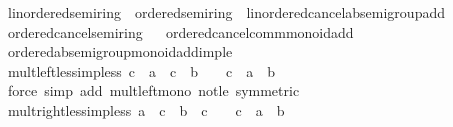 \begin{isabellebody}
\ linordered{\isacharunderscore}{\kern0pt}semiring\ {\isacharequal}{\kern0pt}\ ordered{\isacharunderscore}{\kern0pt}semiring\ {\isacharplus}{\kern0pt}\ linordered{\isacharunderscore}{\kern0pt}cancel{\isacharunderscore}{\kern0pt}ab{\isacharunderscore}{\kern0pt}semigroup{\isacharunderscore}{\kern0pt}add\isanewline
{}\isanewline
\isanewline
{}\isamarkupfalse%
\ ordered{\isacharunderscore}{\kern0pt}cancel{\isacharunderscore}{\kern0pt}semiring%
\isadelimproof
\ %
\endisadelimproof
%
\isatagproof
\isacommand{{\isachardot}{\kern0pt}{\isachardot}{\kern0pt}}\isamarkupfalse%
%
\endisatagproof
{\isafoldproof}%
%
\isadelimproof
%
\endisadelimproof
\isanewline
\isanewline
{}\isamarkupfalse%
\ ordered{\isacharunderscore}{\kern0pt}cancel{\isacharunderscore}{\kern0pt}comm{\isacharunderscore}{\kern0pt}monoid{\isacharunderscore}{\kern0pt}add%
\isadelimproof
\ %
\endisadelimproof
%
\isatagproof
\isacommand{{\isachardot}{\kern0pt}{\isachardot}{\kern0pt}}\isamarkupfalse%
%
\endisatagproof
{\isafoldproof}%
%
\isadelimproof
%
\endisadelimproof
\isanewline
\isanewline
{}\isamarkupfalse%
\ ordered{\isacharunderscore}{\kern0pt}ab{\isacharunderscore}{\kern0pt}semigroup{\isacharunderscore}{\kern0pt}monoid{\isacharunderscore}{\kern0pt}add{\isacharunderscore}{\kern0pt}imp{\isacharunderscore}{\kern0pt}le%
\isadelimproof
\ %
\endisadelimproof
%
\isatagproof
\isacommand{{\isachardot}{\kern0pt}{\isachardot}{\kern0pt}}\isamarkupfalse%
%
\endisatagproof
{\isafoldproof}%
%
\isadelimproof
%
\endisadelimproof
\isanewline
\isanewline
{}\isamarkupfalse%
\ mult{\isacharunderscore}{\kern0pt}left{\isacharunderscore}{\kern0pt}less{\isacharunderscore}{\kern0pt}imp{\isacharunderscore}{\kern0pt}less{\isacharcolon}{\kern0pt}\ {\isachardoublequoteopen}c\ {\isacharasterisk}{\kern0pt}\ a\ {\isacharless}{\kern0pt}\ c\ {\isacharasterisk}{\kern0pt}\ b\ {\isasymLongrightarrow}\ {}\ {\isasymle}\ c\ {\isasymLongrightarrow}\ a\ {\isacharless}{\kern0pt}\ b{\isachardoublequoteclose}\isanewline
%
\isadelimproof
\ \ %
\endisadelimproof
%
\isatagproof
{}\isamarkupfalse%
\ {\isacharparenleft}{\kern0pt}force\ simp\ add{\isacharcolon}{\kern0pt}\ mult{\isacharunderscore}{\kern0pt}left{\isacharunderscore}{\kern0pt}mono\ not{\isacharunderscore}{\kern0pt}le\ {\isacharbrackleft}{\kern0pt}symmetric{\isacharbrackright}{\kern0pt}{\isacharparenright}{\kern0pt}%
\endisatagproof
{\isafoldproof}%
%
\isadelimproof
\isanewline
%
\endisadelimproof
\isanewline
{}\isamarkupfalse%
\ mult{\isacharunderscore}{\kern0pt}right{\isacharunderscore}{\kern0pt}less{\isacharunderscore}{\kern0pt}imp{\isacharunderscore}{\kern0pt}less{\isacharcolon}{\kern0pt}\ {\isachardoublequoteopen}a\ {\isacharasterisk}{\kern0pt}\ c\ {\isacharless}{\kern0pt}\ b\ {\isacharasterisk}{\kern0pt}\ c\ {\isasymLongrightarrow}\ {}\ {\isasymle}\ c\ {\isasymLongrightarrow}\ a\ {\isacharless}{\kern0pt}\ b{\isachardoublequoteclose}\isanewline

\end{isabellebody}
